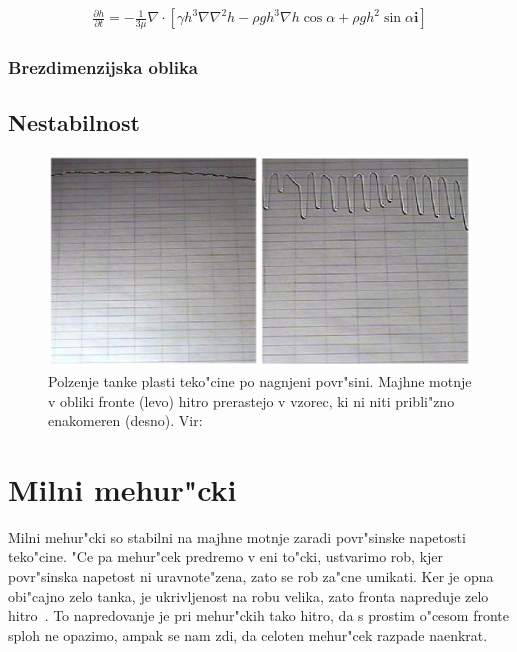 \documentclass[a4paper,10pt]{article}
\renewcommand{\vec}{\mathbf}
\begin{document}
\begin{align}
 \frac{\partial h}{\partial t} = -\frac{1}{3\mu}\nabla \cdot \left[ \gamma h^3 \nabla \nabla^2 h - \rho g h^3 \nabla h \cos \alpha + \rho g h^2 \sin \alpha \vec i \right]
\end{align}

\subsubsection{Brezdimenzijska oblika}

\subsection{Nestabilnost}

\begin{figure}[h]
\centering
 \includegraphics[width=.9\textwidth]{./Slike/film-slika}
\caption{Polzenje tanke plasti teko"cine po nagnjeni povr"sini. Majhne motnje v obliki fronte (levo) hitro prerastejo v vzorec, ki ni niti pribli"zno enakomeren (desno). Vir: \cite{kondic}}
\label{fig:film-neenakomernost}
\end{figure}


\section{Milni mehur"cki}

Milni mehur"cki so stabilni na majhne motnje zaradi povr"sinske napetosti teko"cine. "Ce pa mehur"cek predremo v eni to"cki, ustvarimo rob, kjer povr"sinska napetost ni uravnote"zena, zato se rob za"cne umikati. Ker je opna obi"cajno zelo tanka, 
je ukrivljenost na robu velika, zato fronta napreduje zelo hitro~\cite{diploma}. To napredovanje je pri mehur"ckih tako hitro, da s prostim o"cesom fronte sploh ne opazimo, ampak se nam zdi, da celoten mehur"cek razpade naenkrat. 
 
\end{document}

